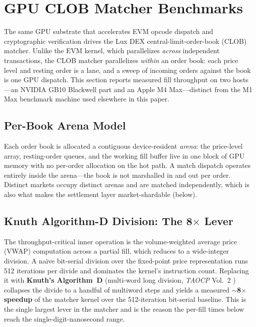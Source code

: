 \section{GPU CLOB Matcher Benchmarks}
\label{sec:clob}

The same GPU substrate that accelerates EVM opcode dispatch and
cryptographic verification drives the Lux DEX central-limit-order-book
(CLOB) matcher. Unlike the EVM kernel, which parallelizes \emph{across}
independent transactions, the CLOB matcher parallelizes \emph{within} an
order book: each price level and resting order is a lane, and a sweep of
incoming orders against the book is one GPU dispatch. This section
reports measured fill throughput on two hosts---an NVIDIA GB10 Blackwell
part and an Apple M4 Max---distinct from the M1 Max benchmark machine
used elsewhere in this paper.

\subsection{Per-Book Arena Model}

Each order book is allocated a contiguous device-resident \emph{arena}:
the price-level array, resting-order queues, and the working fill buffer
live in one block of GPU memory with no per-order allocation on the hot
path. A match dispatch operates entirely inside the arena---the book is
not marshalled in and out per order. Distinct markets occupy distinct
arenas and are matched independently, which is also what makes the
settlement layer market-shardable (below).

\subsection{Knuth Algorithm-D Division: The 8$\times$ Lever}

The throughput-critical inner operation is the volume-weighted average
price (VWAP) computation across a partial fill, which reduces to a
wide-integer division. A na\"ive bit-serial division over the
fixed-point price representation runs 512 iterations per divide and
dominates the kernel's instruction count. Replacing it with
\textbf{Knuth's Algorithm~D} (multi-word long division, \emph{TAOCP}
Vol.~2 \cite{knuth-taocp2}) collapses the divide to a handful of
multiword steps and yields a measured \textbf{$\sim$8$\times$ speedup} of
the matcher kernel over the 512-iteration bit-serial baseline. This is
the single largest lever in the matcher and is the reason the per-fill
times below reach the single-digit-nanosecond range.

